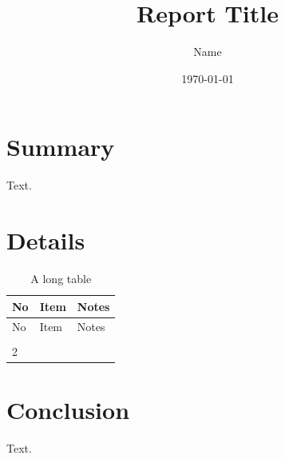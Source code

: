 \documentclass[11pt,a4paper]{article}
\title{\bfseries Report Title}
\author{Name}
\date{\today}
\begin{document}
\maketitle

\section{Summary}
Text.

\section{Details}

\begin{longtable}{@{}p{0.8cm}p{5cm}p{6cm}@{}}
  \caption{A long table}\label{tab:long}\\
  \toprule
  No & Item & Notes \\
  \midrule
  \endfirsthead
  \toprule
  No & Item & Notes \\
  \midrule
  \endhead
  \bottomrule
  \endfoot
  1 & & \\
  2 & & \\
\end{longtable}

\section{Conclusion}
Text.
\end{document}
